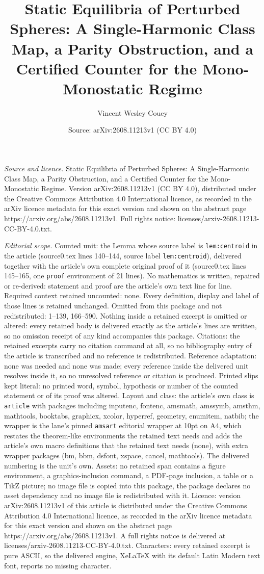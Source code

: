 \documentclass[10pt,a4paper]{amsart}
\title[Static Equilibria of Perturbed Spheres: A Single-Harmonic Cl]{Static Equilibria of Perturbed Spheres: A Single-Harmonic Class Map, a Parity Obstruction, and a Certified Counter for the Mono-Monostatic Regime}
\author{Vincent Wesley Couey}
\date{Source: arXiv:2608.11213v1 (CC BY 4.0)}
\begin{document}
\maketitle

\noindent\emph{Source and licence.} Static Equilibria of Perturbed Spheres: A Single-Harmonic Class Map, a Parity Obstruction, and a Certified Counter for the Mono-Monostatic Regime. Version arXiv:2608.11213v1 (CC BY 4.0), distributed under the Creative Commons Attribution 4.0 International licence, as recorded in the arXiv licence metadata for this exact version and shown on the abstract page https://arxiv.org/abs/2608.11213v1. Full rights notice: licenses/arxiv-2608.11213-CC-BY-4.0.txt.\par\smallskip

\noindent\textit{Editorial scope.} Counted unit: the Lemma whose source label is \texttt{lem:centroid} in the article (source0.tex lines 140--144, source label \texttt{lem:centroid}), delivered together with the article's own complete original proof of it (source0.tex lines 145--165, one \texttt{proof} environment of 21 lines). No mathematics is written, repaired or re-derived: statement and proof are the article's own text line for line. Required context retained uncounted: none. Every definition, display and label of those lines is retained unchanged. Omitted from this package and not redistributed: 1--139, 166--590. Nothing inside a retained excerpt is omitted or altered: every retained body is delivered exactly as the article's lines are written, so no omission receipt of any kind accompanies this package. Citations: the retained excerpts carry no citation command at all, so no bibliography entry of the article is transcribed and no reference is redistributed. Reference adaptation: none was needed and none was made; every reference inside the delivered unit resolves inside it, so no unresolved reference or citation is produced. Printed slips kept literal: no printed word, symbol, hypothesis or number of the counted statement or of its proof was altered. Layout and class: the article's own class is \texttt{article} with packages including inputenc, fontenc, amsmath, amssymb, amsthm, mathtools, booktabs, graphicx, xcolor, hyperref, geometry, enumitem, natbib; the wrapper is the lane's pinned \texttt{amsart} editorial wrapper at 10pt on A4, which restates the theorem-like environments the retained text needs and adds the article's own macro definitions that the retained text needs (none), with extra wrapper packages (bm, bbm, dsfont, xspace, cancel, mathtools). The delivered numbering is the unit's own. Assets: no retained span contains a figure environment, a graphics-inclusion command, a PDF-page inclusion, a table or a TikZ picture; no image file is copied into this package, the package declares no asset dependency and no image file is redistributed with it. Licence: version arXiv:2608.11213v1 of this article is distributed under the Creative Commons Attribution 4.0 International licence, as recorded in the arXiv licence metadata for this exact version and shown on the abstract page https://arxiv.org/abs/2608.11213v1. A full rights notice is delivered at licenses/arxiv-2608.11213-CC-BY-4.0.txt. Characters: every retained excerpt is pure ASCII, so the delivered engine, XeLaTeX with its default Latin Modern text font, reports no missing character.
\end{document}

